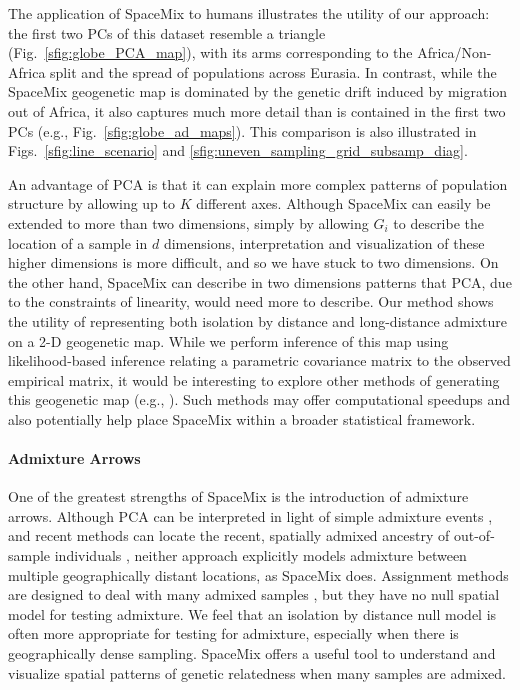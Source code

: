 \documentclass[10pt,letterpaper]{article}
\begin{document}
The application of SpaceMix to humans illustrates the utility of our approach: 
the first two PCs of this dataset resemble a triangle (Fig.\ \ref{sfig:globe_PCA_map}), 
with its arms corresponding to the Africa/Non-Africa split and the spread of populations across Eurasia. 
In contrast, while the SpaceMix geogenetic map is dominated by the genetic drift induced by migration out of Africa,
it also captures much more detail than is contained in the first two PCs (e.g., Fig.\ \ref{sfig:globe_ad_maps}).
This comparison is also illustrated in Figs.\ \ref{sfig:line_scenario} and \ref{sfig:uneven_sampling_grid_subsamp_diag}.

An advantage of PCA is that it can explain more complex patterns of population structure by allowing up to $K$ different axes.
Although SpaceMix can easily be extended to more than two dimensions, 
simply by allowing $G_i$ to describe the location of a sample in $d$ dimensions, 
interpretation and visualization of these higher dimensions is more difficult,
and so we have stuck to two dimensions.
On the other hand, SpaceMix can describe in two dimensions patterns that PCA,
due to the constraints of linearity, would need more to describe.
Our method shows the utility of representing both isolation by distance and 
long-distance admixture on a 2-D geogenetic map.  
While we perform inference of this map using likelihood-based inference 
relating a parametric covariance matrix to the observed empirical matrix, 
it would be interesting to explore other methods of generating this geogenetic map 
(e.g., \cite{Bookstein_1989,Sampson_Guttorp_1992,yang_model-based_2012,Petkova_2014_EEMS}).  
Such methods may offer computational speedups 
and also potentially help place SpaceMix within a broader statistical framework.

\paragraph{Admixture Arrows}
One of the greatest strengths of SpaceMix is the introduction of admixture arrows. 
Although PCA can be interpreted in light of simple admixture events \cite{mcvean_genealogical_2009}, 
and recent methods can locate the recent, spatially admixed ancestry of out-of-sample individuals \cite{yang_model-based_2012,yang_spatial_2014},
neither approach explicitly models admixture between multiple geographically distant locations,
as SpaceMix does.
Assignment methods are designed to deal with many admixed samples \cite{STRUCTURE}, 
but they have no null spatial model for testing admixture.
We feel that an isolation by distance null model is often more appropriate for testing for admixture, 
especially when there is geographically dense sampling. 
SpaceMix offers a useful tool to understand and visualize spatial patterns of genetic relatedness when many samples are admixed. 
\end{document}
